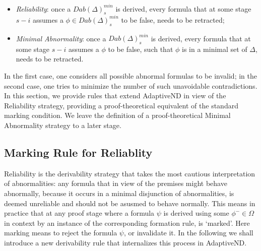 \documentclass[]{article}
\newtheorem{definition}{Definition}
\begin{document}
\begin{itemize}
\item \textit{Reliability}: once a $Dab(\Delta)^{min}_{s}$ is derived, every formula that at some stage $s-i$ assumes a $\phi\in Dab(\Delta)^{min}_{s}$ to be false, needs to be retracted;

\item \textit{Minimal Abnormality}: once a $Dab(\Delta)^{min}_{s}$ is derived, every formula that at some stage $s-i$ assumes a $\phi$ to be false, such that $\phi$ is in a minimal set of $\Delta$, needs to be retracted.
\end{itemize}
%
In the first case, one considers all possible abnormal formulas to be invalid; in the second case, one tries to minimize the number of such unavoidable contradictions. In this section, we provide rules that extend {\sf AdaptiveND} in view of the Reliability strategy, providing a proof-theoretical equivalent of the standard marking condition. 
We leave the definition of a proof-theoretical Minimal Abnormality strategy to a later stage.


\subsection{Marking Rule for Reliablity}

Reliability is the derivability strategy that takes the most cautious interpretation of abnormalities: any formula that in view of the premises might behave abnormally, because it occurs in a minimal disjunction of abnormalities, is deemed unreliable and should not be asusmed to behave normally. This means in practice that at any proof stage where a formula $\psi$ is derived using some $\phi^{-}\in \Omega$ in context by an instance of the corresponding formation rule, is `marked'. Here marking means to reject the formula $\psi$, or invalidate it. In the following we shall introduce a new derivability rule that internalizes this process in {\sf AdaptiveND}.

\end{document}
